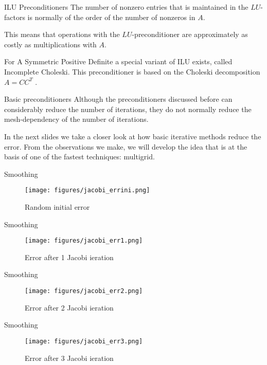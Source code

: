 \begin{frame}{ILU Preconditioners}
  The number of nonzero entries that is maintained in the
$LU$-factors is normally of the order of the number of nonzeros in
$A$.

This means that operations with the $LU$-preconditioner are
approximately as costly as multiplications with $A$.

For A Symmetric Positive Definite a special variant of ILU exists,
called Incomplete Choleski. This preconditioner is based on the
Choleski decomposition $A = CC^T$ .
\end{frame}

\begin{frame}{Basic preconditioners}
  Although the preconditioners discussed before can considerably
reduce the number of iterations, they do not normally reduce the
mesh-dependency of the number of iterations.

In the next slides we take a closer look at how basic iterative
methods reduce the error. From the observations we make, we
will develop the idea that is at the basis of one of the fastest
techniques: multigrid.
\end{frame}

\begin{frame}{Smoothing}
  \begin{figure}[h]
    \centering
    \texttt{[image: figures/jacobi\_errini.png]}
    \caption{Random initial error}
    \label{fig:2}
  \end{figure}
\end{frame}

\begin{frame}{Smoothing}
\begin{figure}[h]
    \centering
    \texttt{[image: figures/jacobi\_err1.png]}
    \caption{Error after 1 Jacobi ieration}
    \label{fig:3}
  \end{figure}
\end{frame}

\begin{frame}{Smoothing}
  \begin{figure}[h]
    \centering
    \texttt{[image: figures/jacobi\_err2.png]}
    \caption{Error after 2 Jacobi ieration}
    \label{fig:4}
  \end{figure}
\end{frame}

\begin{frame}{Smoothing}
  \begin{figure}[h]
    \centering
    \texttt{[image: figures/jacobi\_err3.png]}
    \caption{Error after 3 Jacobi ieration}
    \label{fig:5}
  \end{figure}
\end{frame}

